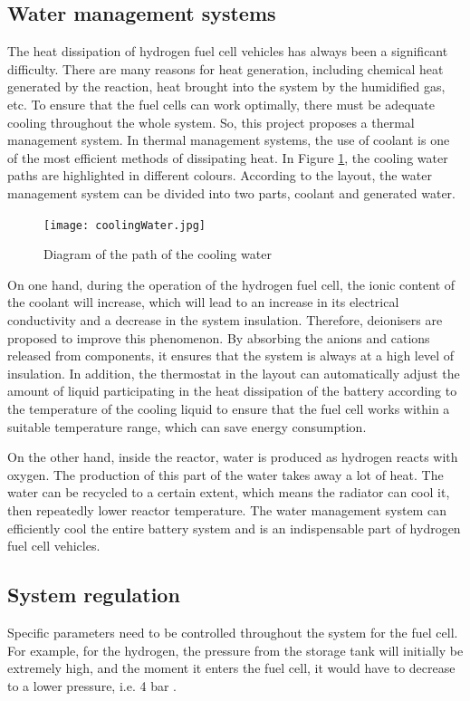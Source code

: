 \documentclass[a4paper,11pt]{article}
\begin{document}
\subsection{Water management systems}

The heat dissipation of hydrogen fuel cell vehicles has always been a significant difficulty. There are many reasons for heat generation, including chemical heat generated by the reaction, heat brought into the system by the humidified gas, etc. To ensure that the fuel cells can work optimally, there must be adequate cooling throughout the whole system. So, this project proposes a thermal management system. In thermal management systems, the use of coolant is one of the most efficient methods of dissipating heat. In Figure \ref{fig:coolingWater}, the cooling water paths are highlighted in different colours. According to the layout, the water management system can be divided into two parts, coolant and generated water.

\begin{figure}[h]
    \texttt{[image: coolingWater.jpg]}
    \caption{Diagram of the path of the cooling water}
    \centering
    \label{fig:coolingWater}  
\end{figure}

On one hand, during the operation of the hydrogen fuel cell, the ionic content of the coolant will increase, which will lead to an increase in its electrical conductivity and a decrease in the system insulation\cite{BARGAL2020635}. Therefore, deionisers are proposed to improve this phenomenon. By absorbing the anions and cations released from components, it ensures that the system is always at a high level of insulation. In addition, the thermostat in the layout can automatically adjust the amount of liquid participating in the heat dissipation of the battery according to the temperature of the cooling liquid to ensure that the fuel cell works within a suitable temperature range, which can save energy consumption.

On the other hand, inside the reactor, water is produced as hydrogen reacts with oxygen. The production of this part of the water takes away a lot of heat. The water can be recycled to a certain extent, which means the radiator can cool it, then repeatedly lower reactor temperature. The water management system can efficiently cool the entire battery system and is an indispensable part of hydrogen fuel cell vehicles.

\subsection{System regulation}
Specific parameters need to be controlled throughout the system for the fuel cell. For example, for the hydrogen, the pressure from the storage tank will initially be extremely high, and the moment it enters the fuel cell, it would have to decrease to a lower pressure, i.e. 4 bar \cite{hoeflinger2020air}.
\end{document}
